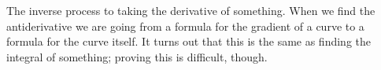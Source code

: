 The inverse process to taking the derivative of something. When we find the 
antiderivative we are going from a formula for the gradient of a curve to a
formula for the curve itself.
It turns out that this is the same as finding the integral of something; proving
this is difficult, though.